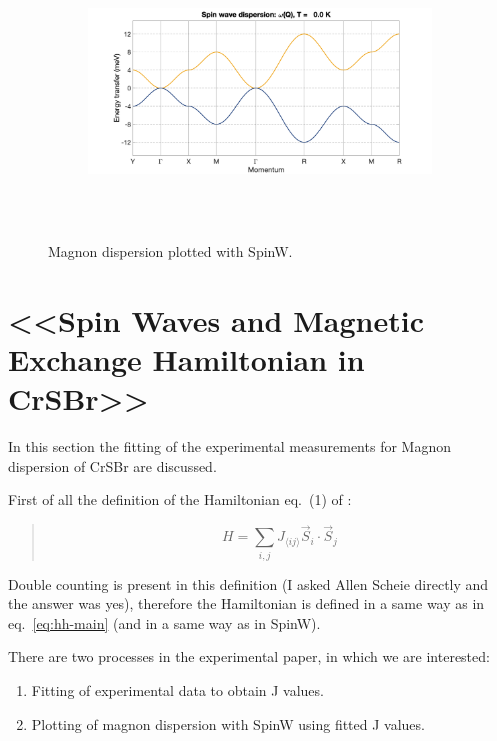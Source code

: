 \documentclass[a4paper,12pt]{article}
\begin{document}
        \begin{figure}[H]
            \centering
            \begin{subfigure}[b]{0.8\textwidth}
                \centering
                \includegraphics[height=7cm]{spinw-cub.png}
            \end{subfigure}
            \hfill
            \caption{Magnon dispersion plotted with SpinW.}
            \label{fig:spinw-cub}
        \end{figure}

    \section{<<Spin Waves and Magnetic Exchange Hamiltonian in CrSBr>>\cite{scheie2022spin}}
        In this section the fitting of the experimental measurements for Magnon dispersion of CrSBr are discussed.

        First of all the definition of the Hamiltonian eq.~(1) of \cite{scheie2022spin}:
        \begin{quote}
            \begin{equation}
                H = \sum_{i,j} J_{\langle ij \rangle} \vec{S}_i \cdot \vec{S}_j
            \end{equation}
        \end{quote}

        Double counting is present in this definition (I asked Allen Scheie directly and the answer was yes), 
        therefore the Hamiltonian is defined in a same way as in eq.~\eqref{eq:hh-main} (and in a same way as in SpinW). 

        There are two processes in the experimental paper, in which we are interested: 
        \begin{enumerate}
            \item Fitting of experimental data to obtain J values.
            \item Plotting of magnon dispersion with SpinW using fitted J values.
        \end{enumerate}
        
\end{document}
